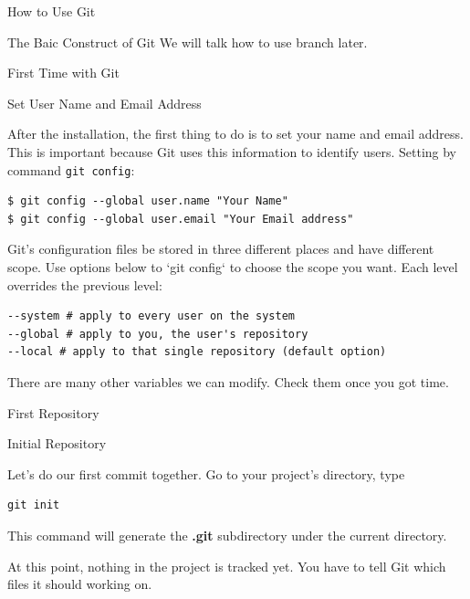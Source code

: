 \documentclass[10pt, a4papaer]{article}
\begin{document}
\begin{section}{How to Use Git}
\begin{subsection}{The Baic Construct of Git}
We will talk how to use branch later.
\newpage
\end{subsection}

\begin{subsection}{First Time with Git}

\begin{subsubsection}{Set User Name and Email Address}

After the installation, the first thing to do is to set your name and email
address. This is important because Git uses this information to identify users.
Setting by command \verb+git config+:

\begin{lstlisting}
$ git config --global user.name "Your Name"
$ git config --global user.email "Your Email address"
\end{lstlisting}

Git's configuration files be stored in three different places and have different
scope. Use options below to `git config` to choose the scope you want. Each
level overrides the previous level:

\begin{lstlisting}
--system # apply to every user on the system
--global # apply to you, the user's repository
--local # apply to that single repository (default option)
\end{lstlisting}

There are many other variables we can modify. Check them once you got time.
\end{subsubsection}

\begin{subsubsection}{First Repository}
\begin{paragraph}{Initial Repository\\}
    
Let's do our first commit together. Go to your project's directory, type 

\begin{lstlisting}
git init
\end{lstlisting}

This command will generate the \textbf{.git} subdirectory under the current directory.


At this point, nothing in the project is tracked yet. You have to tell Git
which files it should working on.


\end{paragraph}
\end{subsubsection}
\end{subsection}
\end{section}
\end{document}
